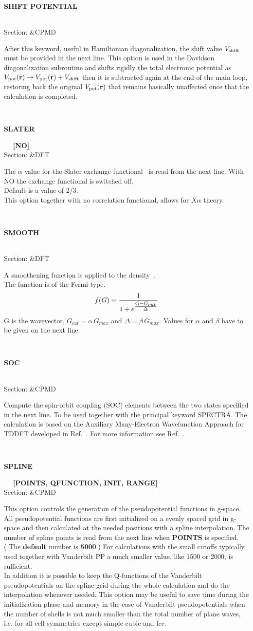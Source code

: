 \documentclass[twoside,10pt,titlepage,a4paper]{article}
\newcommand{\reflabel}[1]{\hypertarget{#1}}
\newcommand{\reflabel}[1]{\label{#1}}
\newcommand{\keyword}[5]{%
\vspace{1.0cm}
\begin{minipage}{15cm}
\reflabel{#1}{\textbf{\large #1}}%
\index{#1}%
\ \textbf{#2}%
\ \textbf{#3}%
\ \textit{#4}%
     \hfill\\\smallskip
     {Section: #5}
     \hfill\\\smallskip\vskip 10pt
\end{minipage}
}%
\newcommand{\desc}[1]{%
   \hspace*{\fill} \parbox{130mm}{\sloppy
                          {#1}%
                             }
     \hfill\\\smallskip
   }%
\newcommand{\desc}[1]{#1\vspace{1ex}}
\begin{document}
\keyword{SHIFT POTENTIAL}{}{}{}{\&CPMD}
  \desc{After this keyword, useful in Hamiltonian diagonalization, the 
      shift value $V_{\rm shift}$ must be provided in the next line.
      This option is used in the Davidson diagonalization 
      subroutine and shifts rigidly the total electronic potential as 
      $V_{\rm pot}({\bf r}) \to V_{\rm pot}({\bf r})+V_{\rm shift}$
      then it is subtracted again at the end of the main loop, restoring
      back the original $V_{\rm pot}({\bf r})$ that remains basically
      unaffected once that the calculation is completed.}

\keyword{SLATER}{}{[NO]}{}{\&DFT}
  \desc{The $\alpha$ value for the Slater exchange
      functional~\cite{Slater51} is read from the next line.
      With NO the exchange functional is switched off.\\
      Default is a value of 2/3.\\
      This option together with no correlation functional, allows for
      $X\alpha$ theory.}

\keyword{SMOOTH}{}{}{}{\&DFT}
  \desc{A smoothening function is applied to the density~\cite{Laasonen93}.\\
      The function is of the Fermi type.
      \[  f(G) = \frac{1}{%
    \displaystyle{1 + e^{\frac{\scriptstyle{G - G_{\scriptstyle cut}}}
                              {\scriptstyle\Delta}}}} \]
      G is the wavevector, $G_{cut} = \alpha\,G_{max}$ and
      $\Delta = \beta\,G_{max}$. Values for $\alpha$ and $\beta$
      have to be given on the next line.}

\keyword{SOC}{}{}{}{\&CPMD}
 \desc{Compute the spin-orbit coupling (SOC) elements between the two states specified in the next line.
       To be used together with the principal keyword SPECTRA.
       The calculation is based on the Auxiliary Many-Electron Wavefunction Approach for TDDFT developed
       in Ref.~\cite{taver}. For more information see Ref.~\cite{SOC}.}

\keyword{SPLINE}{}{[POINTS, QFUNCTION, INIT, RANGE]}{}{\&CPMD}
  \desc{This option controls the generation of the pseudopotential
      functions in g-space. \\
      All pseudopotential functions are first initialized on a evenly
      spaced grid in g-space and then calculated at the needed
      positions with a spline interpolation.
      The number of spline points is read from the next
      line when {\bf POINTS} is specified. \\
      ( The {\bf default} number is {\bf 5000}.)
      For calculations with the small cutoffs typically used together with
      Vanderbilt PP a much smaller value, like 1500 or 2000, is sufficient. \\
      In addition it is possible to keep the Q-functions of
      the Vanderbilt pseudopotentials on the spline grid during
      the whole calculation and do the interpolation whenever needed.
      This option may be useful to save
      time during the initialization phase and memory in the case of
      Vanderbilt pseudopotentials when the number of
      shells is not much smaller
      than the total number of plane waves, i.e. for all cell
      symmetries except simple cubic and fcc.}
\end{document}
